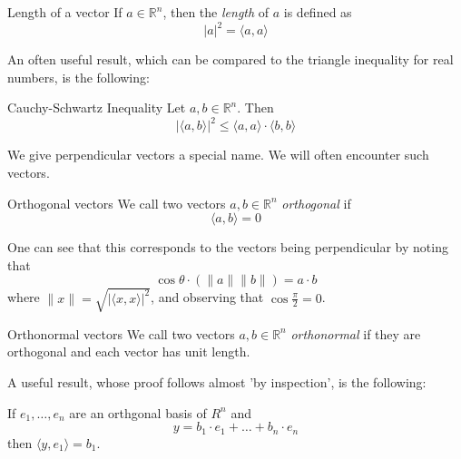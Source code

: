 \documentclass[11pt, %
	oneside, %
	english, %
	onehalfspacing, %
	]{article} %
\numberwithin{equation}{section}
\begin{document}
\begin{definition}{Length of a vector}{}
    If $a \in \mathbb{R}^n$, then the \emph{length} of $a$ is defined as
    \begin{equation*}
        |a|^2=\langle a, a \rangle
    \end{equation*}
\end{definition}

An often useful result, which can be compared to the triangle inequality for real numbers, is the following:

\begin{proposition}{Cauchy-Schwartz Inequality}{}
    Let $a,b \in \mathbb{R}^n$. Then
    \begin{equation*}
        |\langle a, b\rangle|^2 \leq \langle a, a\rangle \cdot \langle b, b\rangle
    \end{equation*}
\end{proposition}

We give perpendicular vectors a special name. We will often encounter such vectors.

\begin{definition}{Orthogonal vectors}{}
    We call two vectors $a,b \in \mathbb{R}^n$ \emph{orthogonal} if
    \begin{equation*}
        \langle a,b \rangle = 0
    \end{equation*}
\end{definition}

One can see that this corresponds to the vectors being perpendicular by noting that
\begin{equation*}
    \cos \theta \cdot (\|a\|\|b\|)= a \cdot b
\end{equation*}
where $\|x\| = \sqrt{|\langle x, x\rangle|^2}$, and observing that $\cos \frac{\pi}{2} = 0$.

\begin{definition}{Orthonormal vectors}{}
    We call two vectors $a,b \in \mathbb{R}^n$ \emph{orthonormal} if they are orthogonal and each vector has unit length.
\end{definition}

A useful result, whose proof follows almost 'by inspection', is the following:

\begin{proposition}{}{}
    If $e_1, \ldots, e_n$ are an orthgonal basis of $R^n$ and
    \begin{equation*}
        y = b_1 \cdot e_1 + \ldots + b_n \cdot e_n
    \end{equation*}
    then $\langle y, e_1 \rangle = b_1$.
\end{proposition}
\end{document}
